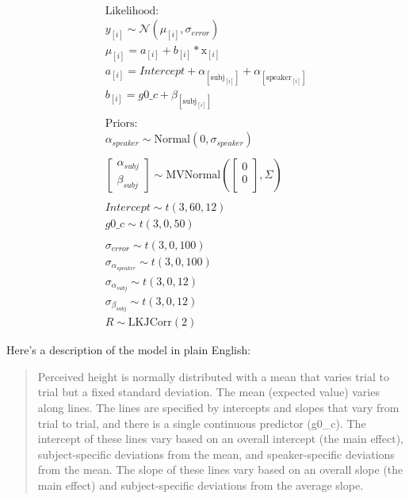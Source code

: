 \documentclass[
]{book}
\begin{document}
\begin{equation}
\begin{split}
\textrm{Likelihood:} \\
y_{[i]} \sim \mathcal{N}(\mu_{[i]},\sigma_{error}) \\
\mu_{[i]} = a_{[i]} + b_{[i]} * \mathrm{x}_{[i]}  \\ 
a_{[i]} = Intercept + \alpha_{[\mathrm{subj}_{[i]}]} + \alpha_{[\mathrm{speaker}_{[i]}]}  \\
b_{[i]} =  g0\_c + \beta_{[\mathrm{subj}_{[i]}]} \\ \\
\textrm{Priors:} \\
\alpha_{speaker} \sim \mathrm{Normal}(0,\sigma_{speaker}) \\ \\  
\begin{bmatrix} \alpha_{subj} \\ \beta_{subj} \end{bmatrix} \sim \mathrm{MVNormal} ( \begin{bmatrix} 0 \\ 0 \\ \end{bmatrix}, \Sigma) \\ \\
Intercept \sim t(3, 60, 12) \\
g0\_c \sim t(3, 0, 50) \\ \\
\sigma_{error} \sim t(3, 0, 100) \\
\sigma_{\alpha_{speaker}} \sim t(3, 0, 100) \\ 
\sigma_{\alpha_{subj}} \sim t(3, 0, 12) \\ 
\sigma_{\beta_{subj}} \sim t(3, 0, 12) \\ 
R \sim \mathrm{LKJCorr} (2)
\end{split}
\label{eq:68}
\end{equation}

Here's a description of the model in plain English:

\begin{quote}
Perceived height is normally distributed with a mean that varies trial to trial but a fixed standard deviation. The mean (expected value) varies along lines. The lines are specified by intercepts and slopes that vary from trial to trial, and there is a single continuous predictor (g0\_c). The intercept of these lines vary based on an overall intercept (the main effect), subject-specific deviations from the mean, and speaker-specific deviations from the mean. The slope of these lines vary based on an overall slope (the main effect) and subject-specific deviations from the average slope.
\end{quote}
\end{document}
